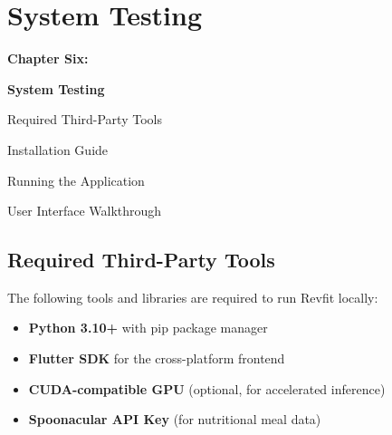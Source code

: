 \chapter{System Testing}

\vspace*{3cm} 
\begin{center}
    {\fontsize{50}{50}\selectfont\bfseries Chapter Six:}
    
    \vspace{3.5cm}
    
    {\fontsize{30}{30}\selectfont\bfseries System Testing}
\end{center}

\thispagestyle{plain}



\vspace{1cm}

\begin{flushleft}

 Required Third-Party Tools
\dotfill \pageref{sec:tools}

\vspace{0.5cm}

 Installation Guide
\dotfill \pageref{sec:installation}

\vspace{0.5cm}

 Running the Application
\dotfill \pageref{sec:running}

\vspace{0.5cm}

 User Interface Walkthrough
\dotfill \pageref{sec:ui}

\end{flushleft}

\newpage


\section{Required Third-Party Tools}
\label{sec:tools}

\large

The following tools and libraries are required to run Revfit locally:

\begin{itemize}
    \item \textbf{Python 3.10+} with pip package manager
    \item \textbf{Flutter SDK} for the cross-platform frontend
    \item \textbf{CUDA-compatible GPU} (optional, for accelerated inference)
    \item \textbf{Spoonacular API Key} (for nutritional meal data) \cite{spoonacular}
\end{itemize}

